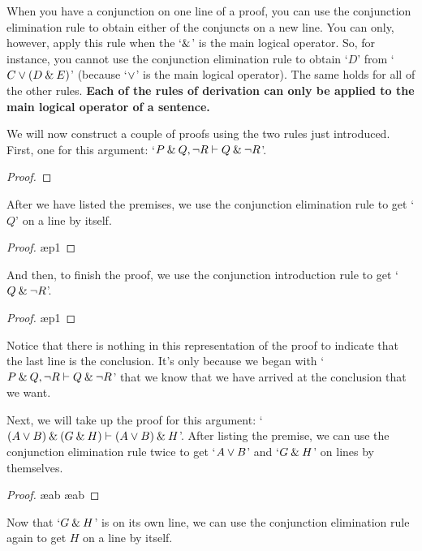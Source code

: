 When you have a conjunction on one line of a proof, you can use the conjunction elimination rule to obtain either of the conjuncts on a new line. You can only, however, apply this rule when the `$\mathbin{\&}$' is the main logical operator. So, for instance, you cannot use the conjunction elimination rule to obtain `$D$' from `$C \vee (D \mathbin{\&} E)$' (because `$\vee$' is the main logical operator). The same holds for all of the other rules. \textbf{Each of the rules of derivation can only be applied to the main logical operator of a sentence.}
\bigskip

\noindent We will now construct a couple of proofs using the two rules just introduced.  First, one for this argument: `$P \mathbin{\&} Q, {\neg} R \vdash Q \mathbin{\&} {\neg} R$'.

\begin{proof}
	 \pr{}
	 \pr{}
\end{proof}\medskip

\noindent After we have listed the premises, we use the conjunction elimination rule to get `$Q$' on a line by itself.

\begin{proof}
	 \pr{}
	 \pr{}
	 \ae{p1}
\end{proof}\medskip

\noindent And then, to finish the proof, we use the conjunction introduction rule to get `$Q \mathbin{\&} {\neg} R$'.

\begin{proof}
	 \pr{}
	 \pr{}
	 \ae{p1}
	 
\end{proof}\medskip
Notice that there is nothing in this representation of the proof to indicate that the last line is the conclusion. It's only because we began with `$P \mathbin{\&} Q, {\neg} R \vdash Q \mathbin{\&} {\neg} R$' that we know that we have arrived at the conclusion that we want.

Next, we will take up the proof for this argument: `$(A\vee B) \mathbin{\&} (G \mathbin{\&} H) \vdash (A\vee B)\mathbin{\&} H$'. After listing the premise, we can use the conjunction elimination rule twice to get `$A\vee B$' and `$G\mathbin{\&} H$' on lines by themselves.
\begin{proof}
	 \pr{}
	 \ae{ab}
	 \ae{ab}
\end{proof}

\noindent Now that `$G\mathbin{\&} H$' is on its own line, we can use the conjunction elimination rule again to get $H$ on a line by itself. 

